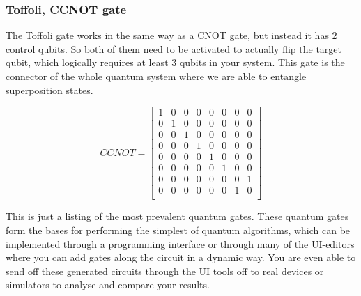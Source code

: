 \subsubsection{Toffoli, CCNOT gate}
The Toffoli gate works in the same way as a CNOT gate, but instead it has 2 control qubits. So both of them need to be activated to actually flip the target qubit, which logically requires at least 3 qubits in your system. This gate is the connector of the whole quantum system where we are able to entangle superposition states.

 \[
CCNOT=
\begin{bmatrix}
1 & 0 & 0 & 0 & 0 & 0 & 0 & 0\\
0 & 1 & 0 & 0 & 0 & 0 & 0 & 0\\
0 & 0 & 1 & 0 & 0 & 0 & 0 &  0\\
0 & 0 & 0 & 1 & 0 & 0 & 0  & 0\\
0 & 0 & 0 & 0 & 1 & 0 & 0  & 0\\
0 & 0 & 0 & 0 & 0 & 1 & 0  & 0\\
0 & 0 & 0 & 0 & 0 & 0 & 0 & 1 \\
0 & 0 & 0 & 0 & 0 & 0 & 1 & 0\\
\end{bmatrix}
\]

This is just a listing of the most prevalent quantum gates. These quantum gates form the bases for performing the simplest of quantum algorithms, which can be implemented through a programming interface or through many of the UI-editors where you can add gates along the circuit in a dynamic way. You are even able to send off these generated circuits through the UI tools off to real devices or simulators to analyse and compare your results.



